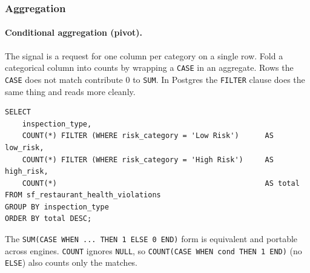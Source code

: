 \vspace{-4ex}

\subsubsection{Aggregation}

\paragraph{Conditional aggregation (pivot).} The signal is a request for one
column per category on a single row. Fold a categorical column into counts by
wrapping a \texttt{CASE} in an aggregate. Rows the \texttt{CASE} does not match
contribute 0 to \texttt{SUM}. In Postgres the \texttt{FILTER} clause does the
same thing and reads more cleanly.

\begin{lstlisting}[style=sql, caption={Pivot risk categories to columns}]
SELECT
    inspection_type,
    COUNT(*) FILTER (WHERE risk_category = 'Low Risk')      AS low_risk,
    COUNT(*) FILTER (WHERE risk_category = 'High Risk')     AS high_risk,
    COUNT(*)                                                AS total
FROM sf_restaurant_health_violations
GROUP BY inspection_type
ORDER BY total DESC;
\end{lstlisting}

\vspace{-1ex}

The \texttt{SUM(CASE WHEN ... THEN 1 ELSE 0 END)} form is equivalent and
portable across engines. \texttt{COUNT} ignores \texttt{NULL}, so
\texttt{COUNT(CASE WHEN cond THEN 1 END)} (no \texttt{ELSE}) also counts only
the matches.

